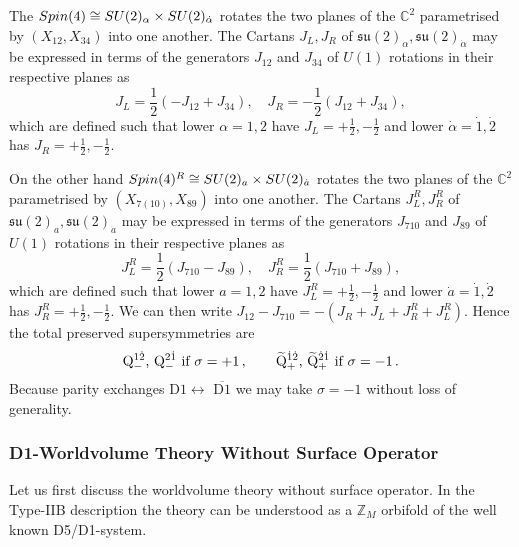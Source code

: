 \documentclass[main.tex]{subfiles}
\begin{document}
The $Spin(4)\cong SU(2)_{\alpha}\times SU(2)_{\dot \alpha}$ rotates the two planes of the $\mathbb{C}^2$ parametrised by $\left(X_{12},X_{34}\right)$ into one another. The Cartans $J_L,J_R$ of $\mathfrak{su}(2)_{\alpha},\mathfrak{su}(2)_{\dot \alpha}$ may be expressed in terms of the generators $J_{12}$ and $J_{34}$ of $U(1)$ rotations in their respective planes as
\begin{equation}
J_L=\frac{1}{2}\left(-J_{12}+J_{34}\right),\quad J_R=-\frac{1}{2}\left(J_{12}+J_{34}\right),
\end{equation}
which are defined such that lower $\alpha=1,2$ have $J_L=+\frac{1}{2},-\frac{1}{2}$ and lower $\dot{\alpha}=\dot1,\dot2$ has $J_R=+\frac{1}{2},-\frac{1}{2}$.  

On the other hand $Spin(4)^R\cong SU(2)_{a}\times SU(2)_{\dot a}$ rotates the two planes of the $\mathbb{C}^2$ parametrised by $\left(X_{7(10)},X_{89}\right)$ into one another. The Cartans $J^R_{L},J_R^R$ of $\mathfrak{su}(2)_{a},\mathfrak{su}(2)_{\dot a}$ may be expressed in terms of the generators $J_{710}$ and $J_{89}$ of $U(1)$ rotations in their respective planes as
\begin{equation}
J_L^R=\frac{1}{2}\left(J_{710}-J_{89}\right),\quad J_R^R=\frac{1}{2}\left(J_{710}+J_{89}\right),
\end{equation}
which are defined such that lower $a=1,2$ have $J_L^R=+\frac{1}{2},-\frac{1}{2}$ and lower $\dot{a}=\dot1,\dot2$ has $J_R^R=+\frac{1}{2},-\frac{1}{2}$. We can then write $J_{12}-J_{710}=-\left(J_R+J_L+J_R^R+J_L^R\right)$. Hence the total preserved supersymmetries are
\begin{equation}
\text{$\mathrm{Q}^{1\dot2}_{-}$, $\mathrm{Q}^{2\dot1}_{-}$ if $\sigma=+1$}\,,\qquad \text{$\widetilde{\mathrm{Q}}^{\dot1\dot2}_{+}$, $\widetilde{\mathrm{Q}}_{+}^{\dot2\dot1}$ if $\sigma=-1$}\,.\label{eqn:pressusy}
\end{equation}
Because parity exchanges D$1\leftrightarrow$ $\overline{\text{D$1$}}$ we may take $\sigma=-1$ without loss of generality.
\subsubsection{D1-Worldvolume Theory Without Surface Operator}
Let us first discuss the worldvolume theory without surface operator. In the Type-IIB description the theory can be understood as a $\mathbb{Z}_M$ orbifold of the well known D5/D1-system.
\end{document}
